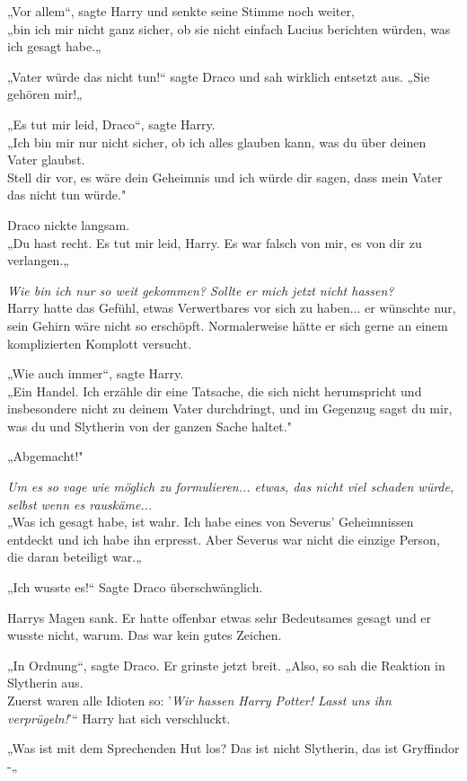 {„Vor allem“, sagte Harry und senkte seine Stimme noch weiter,\\ „bin ich mir nicht ganz sicher, ob sie nicht einfach Lucius berichten würden, was ich gesagt habe.„

„Vater würde das nicht tun!“ sagte Draco und sah wirklich entsetzt aus. „Sie gehören mir!„

„Es tut mir leid, Draco“, sagte Harry.\\ „Ich bin mir nur nicht sicher, ob ich alles glauben kann, was du über deinen Vater glaubst.\\ Stell dir vor, es wäre dein Geheimnis und ich würde dir sagen, dass mein Vater das nicht tun würde."

Draco nickte langsam.\\ „Du hast recht. Es tut mir leid, Harry. Es war falsch von mir, es von dir zu verlangen.„

\emph{Wie bin ich nur so weit gekommen? Sollte er mich jetzt nicht hassen?}\\ Harry hatte das Gefühl, etwas Verwertbares vor sich zu haben... er wünschte nur, sein Gehirn wäre nicht so erschöpft. Normalerweise hätte er sich gerne an einem komplizierten Komplott versucht.

„Wie auch immer“, sagte Harry.\\ „Ein Handel. Ich erzähle dir eine Tatsache, die sich nicht herumspricht und insbesondere nicht zu deinem Vater durchdringt, und im Gegenzug sagst du mir, was du und Slytherin von der ganzen Sache haltet."

„Abgemacht!"

\emph{Um es so vage wie möglich zu formulieren... etwas, das nicht viel schaden würde, selbst wenn es rauskäme...}\\ „Was ich gesagt habe, ist wahr. Ich habe eines von Severus' Geheimnissen entdeckt und ich habe ihn erpresst. Aber Severus war nicht die einzige Person, die daran beteiligt war.„

„Ich wusste es!“ Sagte Draco überschwänglich.

Harrys Magen sank. Er hatte offenbar etwas sehr Bedeutsames gesagt und er wusste nicht, warum. Das war kein gutes Zeichen.

„In Ordnung“, sagte Draco. Er grinste jetzt breit. „Also, so sah die Reaktion in Slytherin aus.\\ Zuerst waren alle Idioten so: '\emph{Wir hassen Harry Potter! Lasst uns ihn verprügeln!}'“ Harry hat sich verschluckt.

„Was ist mit dem Sprechenden Hut los? Das ist nicht Slytherin, das ist Gryffindor -„

}
